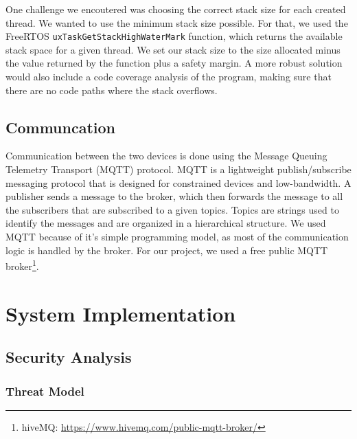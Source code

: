 \documentclass[conference]{IEEEtran}
\begin{document}
One challenge we encoutered was choosing the correct stack size for each created thread.
We wanted to use the minimum stack size possible.
For that, we used the FreeRTOS \texttt{uxTaskGetStackHighWaterMark} function, which returns
the available stack space for a given thread.
We set our stack size to the size allocated minus the value returned by the function plus a safety margin.
A more robust solution would also include a code coverage analysis\cite{CodeCoverage} of the program,
making sure that there are no code paths where the stack overflows.

\subsection{Communcation}

Communication between the two devices is done using the Message Queuing Telemetry Transport (MQTT) protocol\cite{MQTT_Survey}.
MQTT is a lightweight publish/subscribe messaging protocol that is designed for constrained devices and low-bandwidth.
A publisher sends a message to the broker, which then forwards the message to all the subscribers that are subscribed to a given topics.
Topics are strings used to identify the messages and are organized in a hierarchical structure.
We used MQTT because of it's simple programming model, as most of the communication logic is handled by the broker.
For our project, we used a free public MQTT broker\footnote{hiveMQ: \url{https://www.hivemq.com/public-mqtt-broker/}}.

\section{System Implementation}
\label{sec:system_implementation}

\subsection{Security Analysis}
\label{subsec:security_analysis}


\subsubsection{Threat Model}
\end{document}
